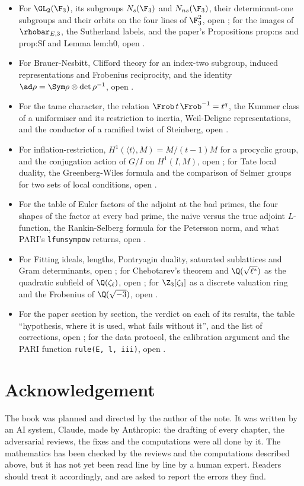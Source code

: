 \begin{itemize}
congruence criterion and oldform lemma of the paper, open .
\item For $\GL_2(\F_3)$, its subgroups $N_s(\F_3)$ and $N_{ns}(\F_3)$, their determinant-one
subgroups and their orbits on the four lines of $\F_3^2$, open ; for the images of
$\rhobar_{E,3}$, the Sutherland labels, and the paper's Propositions prop:ns and prop:Sf and Lemma
lem:h0, open .
\item For Brauer-Nesbitt, Clifford theory for an index-two subgroup, induced representations and
Frobenius reciprocity, and the identity $\ad\rho=\Sym\rho\otimes\det\rho^{-1}$, open
.
\item For the tame character, the relation $\Frob\,t\,\Frob^{-1}=t^{q}$, the Kummer class of a
uniformiser and its restriction to inertia, Weil-Deligne representations, and the conductor of a
ramified twist of Steinberg, open .
\item For inflation-restriction, $H^1(\langle t\rangle,M)=M/(t-1)M$ for a procyclic group, and the
conjugation action of $G/I$ on $H^1(I,M)$, open ; for Tate local duality, the
Greenberg-Wiles formula and the comparison of Selmer groups for two sets of local conditions, open
.
\item For the table of Euler factors of the adjoint at the bad primes, the four shapes of the
factor at every bad prime, the naive versus the true adjoint $L$-function, the Rankin-Selberg
formula for the Petersson norm, and what PARI's \texttt{lfunsympow} returns, open
.
\item For Fitting ideals, lengths, Pontryagin duality, saturated sublattices and Gram
determinants, open ; for Chebotarev's theorem and $\Q(\sqrt{\ell^*})$ as the
quadratic subfield of $\Q(\zeta_\ell)$, open ; for $\Z_3[\zeta_3]$ as a discrete
valuation ring and the Frobenius of $\Q(\sqrt{-3})$, open .
\item For the paper section by section, the verdict on each of its results, the table
``hypothesis, where it is used, what fails without it'', and the list of corrections, open
; for the data protocol, the calibration argument and the PARI function
\texttt{rule(E, l, iii)}, open .
\end{itemize}

\section*{Acknowledgement}

The book was planned and directed by the author of the note. It was written by an AI system,
Claude, made by Anthropic: the drafting of every chapter, the adversarial reviews, the fixes and
the computations were all done by it. The mathematics has been checked by the reviews and the
computations described above, but it has not yet been read line by line by a human expert.
Readers should treat it accordingly, and are asked to report the errors they find.
